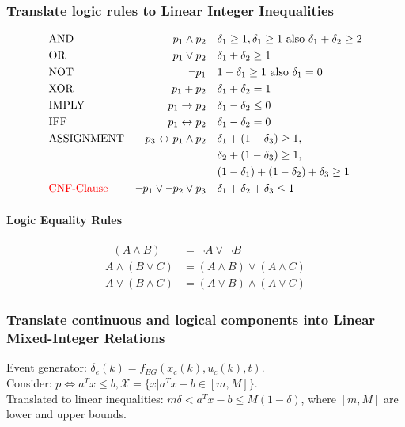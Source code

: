\documentclass[landscape,a4paper,8pt]{scrartcl}
\newcommand{\remph}[1]{{\textcolor{red}{#1}}}
\begin{document}
\begin{multicols*}{3}
\subsubsection{Translate logic rules to Linear Integer Inequalities}
\begin{align*}
&\text{AND} &p_1 \wedge p_2 \quad &\delta_1 \geq 1, \delta_1 \geq 1\text{ also } \delta_1 + \delta_2 \geq 2 \\
&\text{OR} &p_1 \vee p_2 \quad &\delta_1 + \delta_2 \geq 1 \\
&\text{NOT} &\neg p_1 \quad &1-\delta_1 \geq 1 \text{ also } \delta_1 = 0 \\
&\text{XOR} &p_1 + p_2 \quad &\delta_1 + \delta_2 = 1 \\
&\text{IMPLY} &p_1 \rightarrow p_2 \quad &\delta_1 - \delta_2 \leq 0 \\
&\text{IFF} &p_1 \leftrightarrow p_2 \quad &\delta_1 - \delta_2 = 0 \\
&\text{ASSIGNMENT} &p_3 \leftrightarrow p_1 \wedge p_2 \quad & \delta_1 + (1 - \delta_3) \geq 1, \\
& & &\delta_2 + (1 - \delta_3) \geq 1, \\
& & &(1 - \delta_1) + (1 - \delta_2) + \delta_3 \geq 1 \\
&\remph{\text{CNF-Clause}} & \neg p_1 \vee \neg p_2 \vee p_3 \quad & \delta_1 + \delta_2 + \delta_3 \leq 1
\end{align*}
\paragraph{Logic Equality Rules}
\begin{align*}
 \neg (A \wedge B) & = \neg A \vee \neg B \\
A \wedge (B \vee C) & = (A \wedge B) \vee (A\wedge C) \\
A \vee (B \wedge C) & = (A\vee B)\wedge (A \vee C)
\end{align*}
\subsubsection{Translate continuous and logical components into Linear Mixed-Integer Relations}
Event generator: $\delta_e(k) = f_{EG}(x_c(k), u_c(k), t)$. \\
Consider: $p \Leftrightarrow a^Tx \leq b, \mathcal X = \{x | a^T x-b \in [m, M]\}$. \\
Translated to linear inequalities: $ m \delta < a^T x-b \leq M(1-\delta)$, where $[m, M]$ are lower and upper bounds. \\

\end{multicols*}
\end{document}
